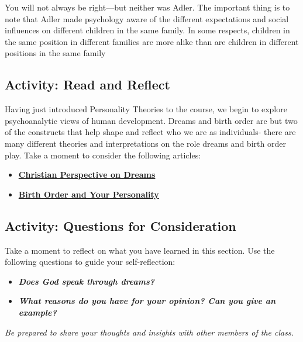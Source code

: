 \documentclass[
]{book}
\providecommand{\tightlist}{%
  \setlength{\itemsep}{0pt}\setlength{\parskip}{0pt}}
\begin{document}
You will not always be right---but neither was Adler. The important thing is to note that Adler made psychology aware of the different expectations and social influences on different children in the same family. In some respects, children in the same position in different families are more alike than are children in differ­ent positions in the same family

\hypertarget{activity-read-and-reflect-3}{%
\subsection*{Activity: Read and Reflect}\label{activity-read-and-reflect-3}}

\begin{reflect}
Having just introduced Personality Theories to the course, we begin to explore psychoanalytic views of human development. Dreams and birth order are but two of the constructs that help shape and reflect who we are as individuals- there are many different theories and interpretations on the role dreams and birth order play. Take a moment to consider the following articles:

\begin{itemize}
\tightlist
\item
  \href{https://www.cgg.org/index.cfm/fuseaction/Library.sr/CT/BQA/k/96/What-Is-Proper-Christian-Perspective-on-Dreams-Visions.htm}{\textbf{Christian Perspective on Dreams}}\\
\item
  \href{https://www.scientificamerican.com/article/ruled-by-birth-order/}{\textbf{Birth Order and Your Personality}}
\end{itemize}
\end{reflect}

\hypertarget{activity-questions-for-consideration-5}{%
\subsection*{Activity: Questions for Consideration}\label{activity-questions-for-consideration-5}}

\begin{reflect}
Take a moment to reflect on what you have learned in this section. Use the following questions to guide your self-reflection:

\begin{itemize}
\tightlist
\item
  \textbf{\emph{Does God speak through dreams?}}\\
\item
  \textbf{\emph{What reasons do you have for your opinion? Can you give an example?}}
\end{itemize}

\emph{Be prepared to share your thoughts and insights with other members of the class.}
\end{reflect}
\end{document}
